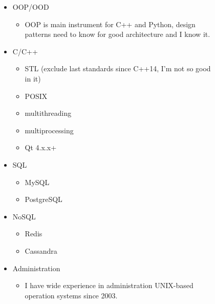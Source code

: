 \documentclass[letterpaper,11pt]{article}
\begin{document}
  \begin{figure}[h!]
    \begin{minipage}[h!]{0.49\textwidth}
      \begin{itemize}
        \item {OOP/OOD}
          \begin{itemize}
            \item OOP is main instrument for C++ and Python, design patterns need to know for good architecture and I know it.
          \end{itemize}
        \item{C/C++}
          \begin{itemize}
	    \item STL (exclude last standards since C++14, I'm not so good in it)
	    \item POSIX
	    \item multithreading
	    \item multiprocessing
	    \item Qt 4.x.x+
          \end{itemize}
      \end{itemize}
    \end{minipage}
    \hfill
    \begin{minipage}[h!]{0.49\textwidth}
      \begin{itemize}
        \item{SQL}
          \begin{itemize}
            \item MySQL
	    \item PostgreSQL
         \end{itemize}
        \item{NoSQL}
          \begin{itemize}
            \item Redis
	    \item Cassandra
          \end{itemize}
        \item{Administration}
          \begin{itemize}
            \item I have wide experience in administration UNIX-based operation systems since 2003.
          \end{itemize}
      \end{itemize}
    \end{minipage}
  \end{figure}
\end{document}
